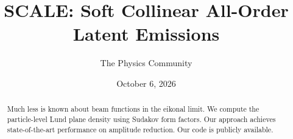 \documentclass[11pt]{article}
\title{SCALE: Soft Collinear All-Order Latent Emissions}
\author{The Physics Community}
\date{October 6, 2026}
\numberwithin{equation}{section}
\theoremstyle{definition}
\theoremstyle{remark}
\begin{document}
\maketitle
\begin{abstract}
Much less is known about beam functions in the eikonal limit. We compute
the particle-level Lund plane density using Sudakov form factors. Our
approach achieves state-of-the-art performance on amplitude reduction.
Our code is publicly available.
\end{abstract}
\tableofcontents





\nocite{*}


\end{document}
